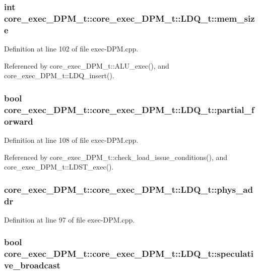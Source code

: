 \subsubsection[{mem\_\-size}]{\setlength{\rightskip}{0pt plus 5cm}int core\_\-exec\_\-DPM\_\-t::core\_\-exec\_\-DPM\_\-t::LDQ\_\-t::mem\_\-size}\label{structcore__exec__DPM__t_1_1LDQ__t_10d6df15476a7ae3fd8524ee7ba8de04}




Definition at line 102 of file exec-DPM.cpp.

Referenced by core\_\-exec\_\-DPM\_\-t::ALU\_\-exec(), and core\_\-exec\_\-DPM\_\-t::LDQ\_\-insert().
\subsubsection[{partial\_\-forward}]{\setlength{\rightskip}{0pt plus 5cm}bool core\_\-exec\_\-DPM\_\-t::core\_\-exec\_\-DPM\_\-t::LDQ\_\-t::partial\_\-forward}\label{structcore__exec__DPM__t_1_1LDQ__t_15375f9fa16ccc59fde7402fb43d487a}




Definition at line 108 of file exec-DPM.cpp.

Referenced by core\_\-exec\_\-DPM\_\-t::check\_\-load\_\-issue\_\-conditions(), and core\_\-exec\_\-DPM\_\-t::LDST\_\-exec().
\subsubsection[{phys\_\-addr}]{ core\_\-exec\_\-DPM\_\-t::core\_\-exec\_\-DPM\_\-t::LDQ\_\-t::phys\_\-addr}\label{structcore__exec__DPM__t_1_1LDQ__t_825f78f49795f0acfb2457adf7513477}




Definition at line 97 of file exec-DPM.cpp.
\subsubsection[{speculative\_\-broadcast}]{\setlength{\rightskip}{0pt plus 5cm}bool core\_\-exec\_\-DPM\_\-t::core\_\-exec\_\-DPM\_\-t::LDQ\_\-t::speculative\_\-broadcast}\label{structcore__exec__DPM__t_1_1LDQ__t_8026bfef253db0a335e221851166c6e9}




